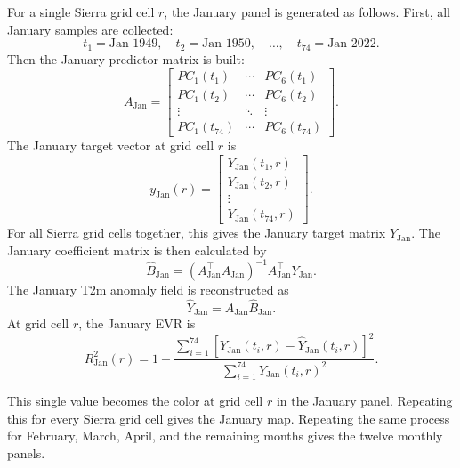 \documentclass[11pt]{article}
\begin{document}
For a single Sierra grid cell $r$, the January panel is generated as follows. First, all January
samples are collected:
\begin{equation}
t_1 = \text{Jan 1949}, \quad
t_2 = \text{Jan 1950}, \quad
\ldots, \quad
t_{74} = \text{Jan 2022}.
\end{equation}
Then the January predictor matrix is built:
\begin{equation}
A_{\mathrm{Jan}}
=
\begin{bmatrix}
PC_1(t_1) & \cdots & PC_6(t_1) \\
PC_1(t_2) & \cdots & PC_6(t_2) \\
\vdots & \ddots & \vdots \\
PC_1(t_{74}) & \cdots & PC_6(t_{74})
\end{bmatrix}.
\end{equation}
The January target vector at grid cell $r$ is
\begin{equation}
y_{\mathrm{Jan}}(r)
=
\begin{bmatrix}
Y_{\mathrm{Jan}}(t_1,r) \\
Y_{\mathrm{Jan}}(t_2,r) \\
\vdots \\
Y_{\mathrm{Jan}}(t_{74},r)
\end{bmatrix}.
\end{equation}
For all Sierra grid cells together, this gives the January target matrix $Y_{\mathrm{Jan}}$. The
January coefficient matrix is then calculated by
\begin{equation}
\widehat{B}_{\mathrm{Jan}}
=
\left(A_{\mathrm{Jan}}^\top A_{\mathrm{Jan}}\right)^{-1}
A_{\mathrm{Jan}}^\top
Y_{\mathrm{Jan}} .
\end{equation}
The January T2m anomaly field is reconstructed as
\begin{equation}
\widehat{Y}_{\mathrm{Jan}}
=
A_{\mathrm{Jan}}
\widehat{B}_{\mathrm{Jan}} .
\end{equation}
At grid cell $r$, the January EVR is
\begin{equation}
R^2_{\mathrm{Jan}}(r)
=
1
-
\frac{
\sum_{i=1}^{74}
\left[
Y_{\mathrm{Jan}}(t_i,r)
-
\widehat{Y}_{\mathrm{Jan}}(t_i,r)
\right]^2
}{
\sum_{i=1}^{74}
Y_{\mathrm{Jan}}(t_i,r)^2
}.
\end{equation}

This single value becomes the color at grid cell $r$ in the January panel. Repeating this for every
Sierra grid cell gives the January map. Repeating the same process for February, March, April, and
the remaining months gives the twelve monthly panels.
\end{document}
